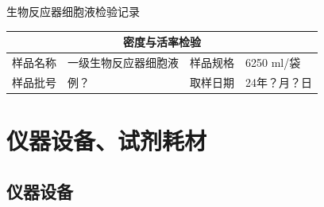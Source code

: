 \documentclass[UTF8,10pt,a4paper,fontset=fandol]{ctexart}
\newcommand{\fieldvalue}[1]{#1}
\newcommand{\handwritten}[1]{#1}
\begin{document}

\newpage

\begin{center}
生物反应器细胞液检验记录
\end{center}

\begin{tabularx}{\textwidth}{|c|X|c|X|}
\hline
\multicolumn{4}{|c|}{密度与活率检验}\\
\hline
样品名称 &
\fieldvalue{一级生物反应器细胞液} &
样品规格 &
\fieldvalue{\handwritten{6250}} ml/袋\\
\hline
样品批号 &
\fieldvalue{\handwritten{例？}} &
取样日期 &
\fieldvalue{\handwritten{24年？月？日}}\\
\hline
\end{tabularx}

\section{仪器设备、试剂耗材}

\subsection{仪器设备}
\end{document}
